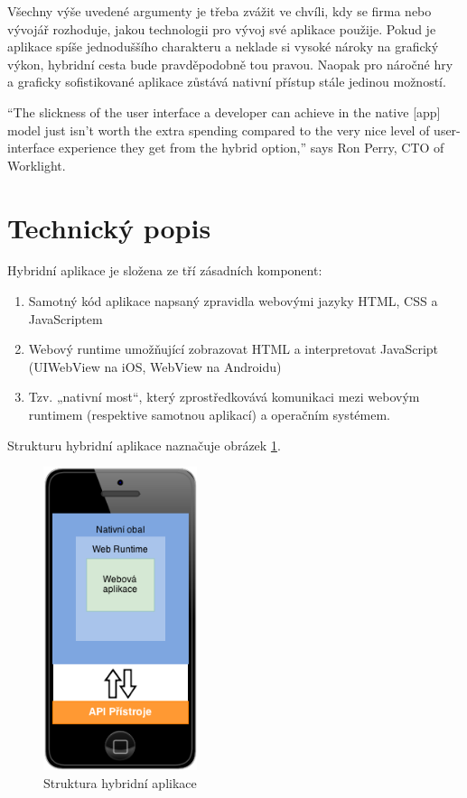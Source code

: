 Všechny výše uvedené argumenty je třeba zvážit ve chvíli, kdy se firma nebo vývojář rozhoduje, jakou technologii pro vývoj své aplikace použije. Pokud je aplikace spíše jednoduššího charakteru a neklade si vysoké nároky na grafický výkon, hybridní cesta bude pravděpodobně tou pravou. Naopak pro náročné hry a graficky sofistikované aplikace zůstává nativní přístup stále jedinou možností.

“The slickness of the user interface a developer can achieve in the native [app] model just isn’t worth the extra spending compared to the very nice level of user-interface experience they get from the hybrid option,” says Ron Perry, CTO of Worklight. \cite{hybrid_app_technology_overview}

\section{Technický popis} \label{Sec:TechnickyPopis}
Hybridní aplikace je složena ze tří zásadních komponent:

\begin{enumerate}
	\item Samotný kód aplikace napsaný zpravidla webovými jazyky HTML, CSS a JavaScriptem
	\item Webový runtime umožňující zobrazovat HTML a interpretovat JavaScript (UIWebView na iOS, WebView na Androidu)
	\item Tzv. „nativní most“, který zprostředkovává komunikaci mezi webovým runtimem (respektive samotnou aplikací) a operačním systémem.
\end{enumerate}

Strukturu hybridní aplikace naznačuje obrázek \ref{fig:HybridAppArchitecture}.

\begin{figure}\centering
\includegraphics[width=0.4\textwidth]{hybrid_app_architecture.png}
\caption{Struktura hybridní aplikace \cite{ibm_worklight_overview}}
\label{fig:HybridAppArchitecture}
\end{figure} 

